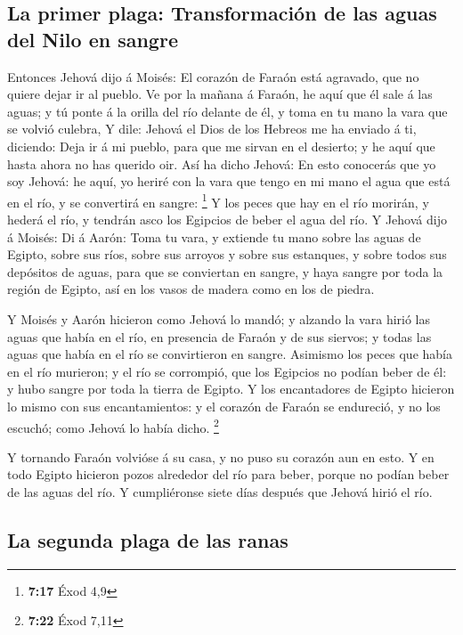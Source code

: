 \hypertarget{la-primer-plaga-transformaciuxf3n-de-las-aguas-del-nilo-en-sangre}{%
\subsection{La primer plaga: Transformación de las aguas del Nilo en
sangre}\label{la-primer-plaga-transformaciuxf3n-de-las-aguas-del-nilo-en-sangre}}

 Entonces Jehová dijo á Moisés: El corazón de Faraón está
agravado, que no quiere dejar ir al pueblo.  Ve por la
mañana á Faraón, he aquí que él sale á las aguas; y tú ponte á la orilla
del río delante de él, y toma en tu mano la vara que se volvió culebra,
 Y dile: Jehová el Dios de los Hebreos me ha enviado á ti,
diciendo: Deja ir á mi pueblo, para que me sirvan en el desierto; y he
aquí que hasta ahora no has querido oir.  Así ha dicho
Jehová: En esto conocerás que yo soy Jehová: he aquí, yo heriré con la
vara que tengo en mi mano el agua que está en el río, y se convertirá en
sangre: \footnote{\textbf{7:17} Éxod 4,9}  Y los peces que
hay en el río morirán, y hederá el río, y tendrán asco los Egipcios de
beber el agua del río.  Y Jehová dijo á Moisés: Di á Aarón:
Toma tu vara, y extiende tu mano sobre las aguas de Egipto, sobre sus
ríos, sobre sus arroyos y sobre sus estanques, y sobre todos sus
depósitos de aguas, para que se conviertan en sangre, y haya sangre por
toda la región de Egipto, así en los vasos de madera como en los de
piedra.

 Y Moisés y Aarón hicieron como Jehová lo mandó; y alzando
la vara hirió las aguas que había en el río, en presencia de Faraón y de
sus siervos; y todas las aguas que había en el río se convirtieron en
sangre.  Asimismo los peces que había en el río murieron; y
el río se corrompió, que los Egipcios no podían beber de él: y hubo
sangre por toda la tierra de Egipto.  Y los encantadores de
Egipto hicieron lo mismo con sus encantamientos: y el corazón de Faraón
se endureció, y no los escuchó; como Jehová lo había dicho. \footnote{\textbf{7:22}
  Éxod 7,11}

 Y tornando Faraón volvióse á su casa, y no puso su corazón
aun en esto.  Y en todo Egipto hicieron pozos alrededor del
río para beber, porque no podían beber de las aguas del río.
 Y cumpliéronse siete días después que Jehová hirió el río.

\hypertarget{la-segunda-plaga-de-las-ranas}{%
\subsection{La segunda plaga de las
ranas}\label{la-segunda-plaga-de-las-ranas}}

